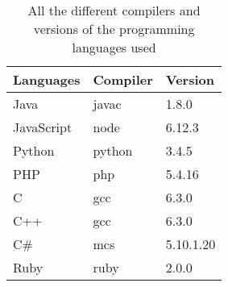 \begin{table}[h]
\centering
\begin{tabular}{|l|l|l|}
\hline
Languages  & Compiler & Version   \\ \hline
Java       & javac    & 1.8.0\textunderscore161 \\ \hline
JavaScript & node     & 6.12.3    \\ \hline
Python     & python   & 3.4.5     \\ \hline
PHP        & php      & 5.4.16    \\ \hline
C          & gcc      & 6.3.0     \\ \hline
C++        & gcc      & 6.3.0     \\ \hline
C\#         & mcs      & 5.10.1.20 \\ \hline
Ruby       & ruby     & 2.0.0     \\ \hline
\end{tabular}
\caption{All the different compilers and versions of the programming languages used}
\label{tab:version}
\end{table}


